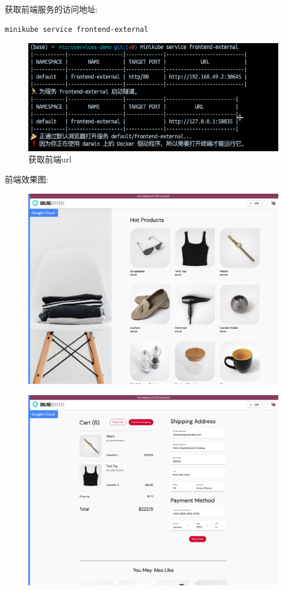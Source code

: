 \documentclass[hyperref,a4paper,UTF8]{ctexart}
\begin{document}
获取前端服务的访问地址: 
\begin{lstlisting}
minikube service frontend-external
\end{lstlisting}
\begin{figure}[H]
    \centering
    \includegraphics[width=0.75\linewidth]{部署/获取url.png}
    \caption{获取前端url}
    \label{fig:enter-label}
\end{figure}

前端效果图:
\begin{figure}[H]
    \centering
    \includegraphics[width=0.75\linewidth]{部署/前端1.png}
    \label{fig:enter-label}
\end{figure}
\begin{figure}[H]
    \centering
    \includegraphics[width=0.75\linewidth]{部署/前端2.png}
    \label{fig:enter-label}
\end{figure}
\end{document}

